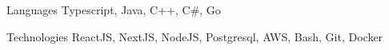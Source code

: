 

\begin{cvskills}

  \cvskill
    {Languages} %
    {Typescript, Java, C++, C\#, Go} %

  \cvskill
    {Technologies} %
    {ReactJS, NextJS, NodeJS, Postgresql, AWS, Bash, Git, Docker} %

\end{cvskills}
